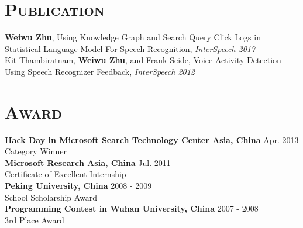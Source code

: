 \begin{resume}
\vspace*{-8pt}
\section{\textsc{Publication}}
\textbf{Weiwu Zhu}, Using Knowledge Graph and Search Query Click Logs in Statistical Language Model For Speech Recognition, {\it InterSpeech 2017}\\
\vspace*{-6pt}
\newline
Kit Thambiratnam, \textbf{Weiwu Zhu}, and Frank Seide, Voice Activity Detection Using Speech Recognizer Feedback, {\it InterSpeech 2012}\\








\vspace*{-12pt}
\section{\textsc{Award}}
\textbf{Hack Day in Microsoft Search Technology Center Asia, China} \hfill Apr. 2013 \\
Category Winner\\
\newline
\textbf{Microsoft Research Asia, China} \hfill Jul. 2011 \\
Certificate of Excellent Internship\\
\newline
\textbf{Peking University, China} \hfill 2008 - 2009 \\
School Scholarship Award\\
\newline
\textbf{Programming Contest in Wuhan University, China} \hfill 2007 - 2008 \\
3rd Place Award\\


\end{resume}
